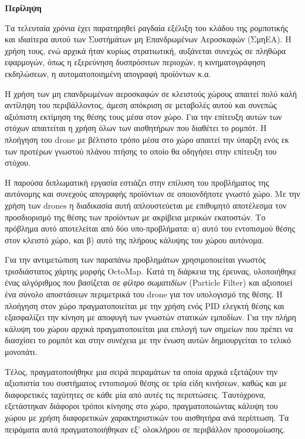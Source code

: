 \begin{center}
  \centering

  \vspace{0.5cm}
  \centering
  \textbf{\Large{Περίληψη}}

  \vspace{1cm}

\end{center}

Τα τελευταία χρόνια έχει παρατηρηθεί ραγδαία εξέλιξη του κλάδου της ρομποτικής και ιδιαίτερα αυτού των Συστήμάτων μη Επανδρωμένων Αεροσκαφών (ΣμηΕΑ). Η χρήση τους, ενώ αρχικά ήταν κυρίως στρατιωτική, αυξάνεται συνεχώς σε πληθώρα εφαρμογών, όπως η εξερεύνηση δυσπρόσιτων περιοχών, η κινηματογράφηση εκδηλώσεων, η αυτοματοποιημένη απογραφή προϊόντων κ.α. 

Η χρήση των μη επανδρωμένων αεροσκαφών σε κλειστούς χώρους απαιτεί πολύ καλή αντίληψη του περιβάλλοντος, άμεση απόκριση σε μεταβολές αυτού και συνεπώς αξιόπιστη εκτίμηση της θέσης τους μέσα στον χώρο. Για την επίτευξη αυτών των στόχων απαιτείται η χρήση όλων των αισθητήρων που διαθέτει το ρομπότ. Η πλοήγηση του drone με βέλτιστο τρόπο μέσα στο χώρο απαιτεί την ύπαρξη ενός εκ των προτέρων γνωστού πλάνου πτήσης το οποίο θα οδηγήσει στην επίτευξη του στόχου.

Η παρούσα διπλωματική εργασία εστιάζει στην επίλυση του προβλήματος της αυτόνομης και συνεχούς απογραφής προϊόντων σε οποιονδήποτε γνωστό χώρο. Με την χρήση των drones η διαδικασία αυτή απλουστεύεται με επιθυμητό αποτέλεσμα τον προσδιορισμό της θέσης των προϊόντων με ακρίβεια μερικών εκατοστών. Το πρόβλημα αυτό αποτελείται από δύο υπο-προβλήματα: α) αυτό του εντοπισμού θέσης στον κλειστό χώρο, και β) αυτό της πλήρους κάλυψης του χώρου αυτόνομα.     

Για την αντιμετώπιση των παραπάνω προβλημάτων χρησιμοποιείται γνωστός τρισδιάστατος χάρτης μορφής OctoMap. Κατά τη διάρκεια της έρευνας, υλοποιήθηκε ένας αλγόριθμος που βασίζεται σε \emph{φίλτρο σωματιδίων} (Particle Filter) και αξιοποιεί ένα σύνολο αποστάσεων περιμετρικά του drone για τον υπολογισμό της θέσης. Η πλοήγηση στον χώρο πραγματοποιείται με την χρήση ενός PID ελεγκτή θέσης και εξασφαλίζει την κίνηση με αποφυγή των γνωστών στατικών εμποδίων. Για την πλήρη κάλυψη του χώρου αρχικά πραγματοποιείται μια επιλογή των σημείων που πρέπει να διασχίσει το ρομπότ και στην συνέχεια με την ένωση αυτών δημιουργείται το τελικό μονοπάτι.

Τέλος, πραγματοποιήθηκε μια σειρά πειραμάτων τα οποία αρχικά εξετάζουν την αξιοπιστία του συστήματος εντοπισμού θέσης σε τρία είδη κινήσεων, καθώς και με διαφορετικές ταχύτητες σε κάθε μία από αυτές τις περιπτώσεις. Ταυτόχρονα, εξετάστηκαν διάφοροι τρόποι κίνησης στο χώρο, πραγματοποιώντας κάλυψη του χώρου με χρήση διαφορετικών χαρακτηριστικών του αισθητήρα ανά περίπτωση. Τα πειράματα αυτά πραγματοποιήθηκαν εξ' ολοκλήρου σε περιβάλλον προσομοίωσης.